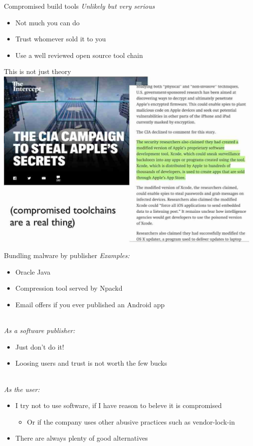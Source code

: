 \documentclass[11pt]{beamer}
\begin{document}
\begin{frame}{Compromised build tools}
\emph{Unlikely but very serious}
\\[0.2cm]
\begin{itemize}
\item Not much you can do
\item Trust whomever sold it to you
\item Use a well reviewed open source tool chain
\end{itemize}
\end{frame}

\begin{frame}{This is not just theory}
\includegraphics[scale=0.23]{apple_toolchain.png}
\end{frame}

\begin{frame}{Bundling malware by publisher}
\emph{Examples:}
\begin{itemize}
\item Oracle Java
\item Compression tool served by Npackd %
\item Email offers if you ever published an Android app
\end{itemize}
\\[0.2cm]
\pause
\emph{As a software publisher:}
\begin{itemize}
\item Just don't do it!
\item Loosing users and trust is not worth the few bucks
\end{itemize}
\\[0.2cm]
\pause
\emph{As the user:}
\begin{itemize}
\item I try not to use software, if I have reason to beleve it is compromised %
\begin{itemize}
\item Or if the company uses other abusive practices such as vendor-lock-in
\end{itemize}
\item There are always plenty of good alternatives
\end{itemize}
\end{frame}
\end{document}

